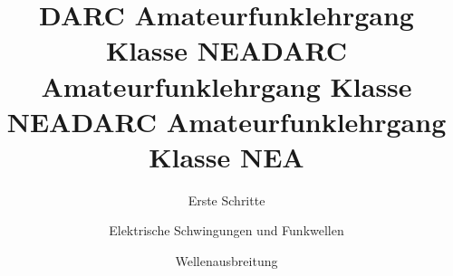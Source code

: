 \documentclass[aspectratio = 169]{beamer}
\begin{document}

\title{DARC Amateurfunklehrgang Klasse NEA}
\author{Erste Schritte}
\begin{frame}
\maketitle
\end{frame}










\title{DARC Amateurfunklehrgang Klasse NEA}
\author{Elektrische Schwingungen und Funkwellen}
\begin{frame}
\maketitle
\end{frame}


















\title{DARC Amateurfunklehrgang Klasse NEA}
\author{Wellenausbreitung}
\begin{frame}
\maketitle
\end{frame}





























\end{document}
